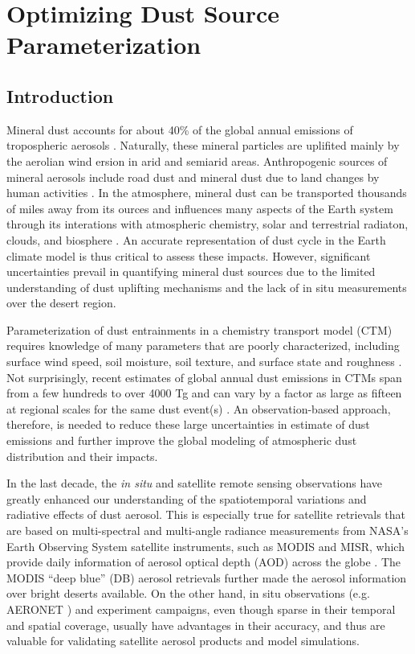 \chapter{Optimizing Dust Source Parameterization} \label{chap:optdead}

\section{Introduction}

 Mineral dust accounts for about 40\% of the global annual emissions of tropospheric aerosols
 \citep{textor06,boucher13}. Naturally, these mineral
 particles are uplifited mainly by the aerolian wind ersion in arid and semiarid areas.
 Anthropogenic sources of mineral aerosols include road dust and mineral dust due to land
 changes by human activities \citep{tegen96,tegen04,ginoux12}.
 In the atmosphere, mineral dust can be transported thousands of miles away from its ources
 \citep{husar01,toon03} and influences many aspects of the Earth system through
 its interations with atmospheric chemistry,
 solar and terrestrial radiaton, clouds, and biosphere \citep{shao11,ravi11,satheesh05,carslaw10}. An accurate representation of dust cycle in the Earth climate model is thus critical
 to assess these impacts. However, significant uncertainties prevail in quantifying
 mineral dust sources due to the limited understanding of dust uplifting mechanisms and the
 lack of in situ measurements over the desert region.

 Parameterization of dust entrainments in a
 chemistry transport model (CTM) requires knowledge of many parameters that are
 poorly characterized, including surface wind speed, soil moisture, soil texture,
 and surface state and roughness \citep{tegen94,ginoux01,zender03a}.
 Not surprisingly, recent estimates of global annual dust emissions in CTMs
 span from a few hundreds to over 4000 Tg \citep{huneeus11} and can vary by
 a factor as large as fifteen at regional scales for the same dust event(s) \citep{uno06}.
 An observation-based approach, therefore, is needed
 to reduce these large uncertainties in estimate of
 dust emissions and further improve the global modeling of atmospheric dust distribution
 and their impacts.

 In the last decade, the \textit{in situ} and satellite remote sensing observations
 have greatly enhanced our understanding of the spatiotemporal variations and
 radiative effects of dust aerosol.
 This is especially true for satellite retrievals that are based on
 multi-spectral and multi-angle radiance measurements
 from NASA’s Earth Observing System satellite instruments, such as MODIS and MISR,
 which provide daily information of aerosol optical depth (AOD) across the globe
 \citep{king99,kaufman02,martonchik09}.
 The MODIS “deep blue” (DB) aerosol retrievals \citep{hsu06,hsu13}
 further made the aerosol information over bright deserts available.
 On the other hand, in situ observations (e.g. AERONET \citep{holben98})
 and experiment campaigns, even though sparse in their temporal and spatial coverage,
 usually have advantages in their accuracy,
 and thus are valuable for validating satellite aerosol products and model simulations.

